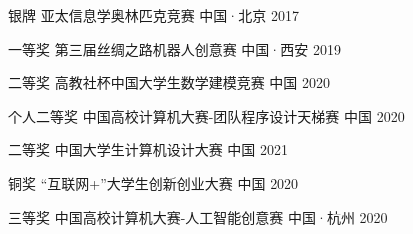 



\begin{cvhonors}

  \cvhonor
    {银牌} %
    {亚太信息学奥林匹克竞赛} %
    {中国·北京} %
    {2017} %

\end{cvhonors}




\begin{cvhonors}

  \cvhonor
    {一等奖} %
    {第三届丝绸之路机器人创意赛} %
    {中国·西安} %
    {2019} %

  \cvhonor
    {二等奖} %
    {高教社杯中国大学生数学建模竞赛} %
    {中国} %
    {2020} %
    
	\cvhonor
	{个人二等奖} %
	{中国高校计算机大赛-团队程序设计天梯赛} %
	{中国} %
	{2020} %

	\cvhonor
	{二等奖} %
	{中国大学生计算机设计大赛} %
	{中国} %
	{2021} %


	\cvhonor
	{铜奖} %
	{“互联网+”大学生创新创业大赛} %
	{中国} %
	{2020} %

	\cvhonor
	{三等奖} %
	{中国高校计算机大赛-人工智能创意赛} %
	{中国·杭州} %
	{2020} %

\end{cvhonors}

